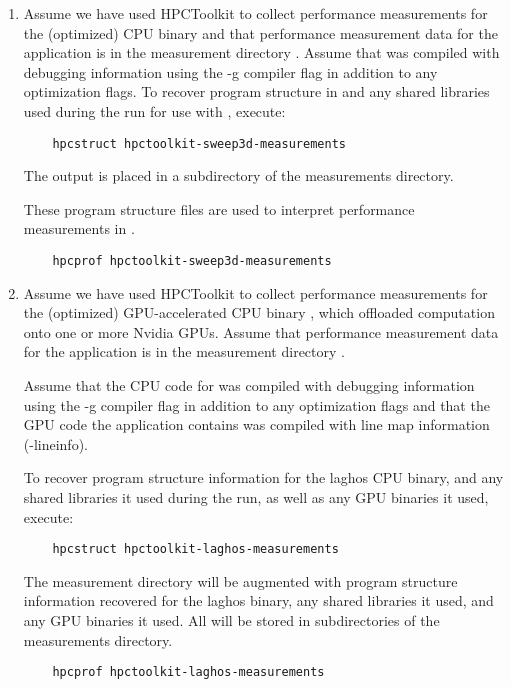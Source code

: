 \documentclass[english]{article}
\begin{document}
\begin{enumerate}
\item 
Assume we have used HPCToolkit to collect performance measurements for the (optimized) CPU binary 
 and that performance measurement data for the application is in the measurement 
directory . 
Assume that  was compiled with debugging information using the -g compiler flag in addition to any
optimization flags. 
To recover program structure in  and any shared libraries used during the run
for use with , execute:

\begin{verbatim}
    hpcstruct hpctoolkit-sweep3d-measurements
\end{verbatim}

The output is placed in a subdirectory of the measurements directory.

These program structure files are used to interpret performance measurements in . 

\begin{verbatim}
    hpcprof hpctoolkit-sweep3d-measurements
\end{verbatim}


\item
Assume we have used HPCToolkit to collect performance measurements for the (optimized) GPU-accelerated 
CPU binary , which offloaded computation onto one or more Nvidia GPUs.
Assume that performance measurement data for the application is in the measurement 
directory . 

Assume that the CPU code for  was compiled with debugging information using the -g compiler flag in addition to any
optimization flags and that the GPU code the application contains was compiled with line map information (-lineinfo).

To recover program structure information for the laghos CPU binary, and any shared libraries it used
during the run, as well as any GPU binaries it used, execute:

\begin{verbatim}
    hpcstruct hpctoolkit-laghos-measurements
\end{verbatim}

The measurement directory will be augmented with program structure information recovered for the
laghos binary, any shared libraries it used, and any GPU binaries it used.  All will be
stored in subdirectories of the measurements directory.

\begin{verbatim}
    hpcprof hpctoolkit-laghos-measurements
\end{verbatim}

\end{enumerate}
\end{document}
